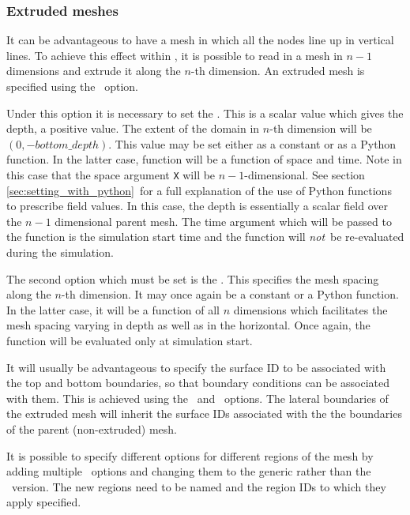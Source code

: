 \subsubsection{Extruded meshes}\label{sec:extruded}

It can be advantageous to have a mesh in which all the nodes line up in
vertical lines. To achieve this effect within \fluidity, it is possible to
read in a mesh in $n-1$ dimensions and extrude it along the $n$-th
dimension. An extruded mesh is specified using the
\ option. 

Under this option it is necessary to set the . This is
a scalar value which gives the depth, a positive value. The extent of the
domain in $n$-th dimension will be $(0,-bottom\_depth)$. This value may be
set either as a constant or as a Python function. In the latter case,
function will be a function of space and time. Note in this case that the
space argument \lstinline[language=Python]+X+ will be $n-1$-dimensional. See
section \ref{sec:setting_with_python}\ for a full explanation of the use of Python functions to
prescribe field values. In this case, the depth is essentially a scalar
field over the $n-1$ dimensional parent mesh. The time argument which
will be passed to the function is the simulation start time and the function
will \emph{not}\ be re-evaluated during the simulation.

The second option which must be set is the
. This specifies the mesh spacing
along the $n$-th dimension. It may once again be a constant or a Python
function. In the latter case, it will be a function of all $n$ dimensions
which facilitates the mesh spacing varying in depth as well as in the
horizontal. Once again, the function will be evaluated only at simulation
start. 

It will usually be advantageous to specify the surface ID to be associated
with the top and bottom boundaries, so that boundary conditions can be
associated with them. This is achieved using the
\ and
\ options. The lateral boundaries
of the extruded mesh will inherit the surface IDs associated with the the
boundaries of the parent (non-extruded) mesh.

It is possible to specify different options for different regions of the
mesh by adding multiple \ options and changing
them to the generic rather than the \
version. The new regions need to be named and the region IDs to which they
apply specified.

